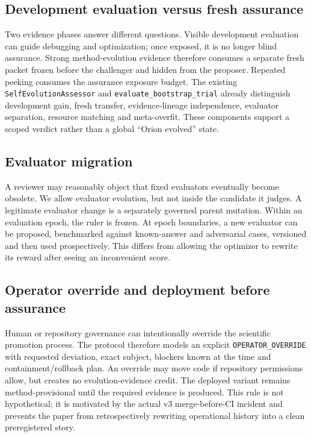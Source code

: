 \subsection{Development evaluation versus fresh assurance}

Two evidence phases answer different questions. Visible development evaluation can guide debugging and optimization; once exposed, it is no longer blind assurance. Strong method-evolution evidence therefore consumes a separate fresh packet frozen before the challenger and hidden from the proposer. Repeated peeking consumes the assurance exposure budget. The existing \texttt{SelfEvolutionAssessor} and \texttt{evaluate\_bootstrap\_trial} already distinguish development gain, fresh transfer, evidence-lineage independence, evaluator separation, resource matching and meta-overfit. These components support a scoped verdict rather than a global ``Orion evolved'' state.

\subsection{Evaluator migration}

A reviewer may reasonably object that fixed evaluators eventually become obsolete. We allow evaluator evolution, but not inside the candidate it judges. A legitimate evaluator change is a separately governed parent mutation. Within an evaluation epoch, the ruler is frozen. At epoch boundaries, a new evaluator can be proposed, benchmarked against known-answer and adversarial cases, versioned and then used prospectively. This differs from allowing the optimizer to rewrite its reward after seeing an inconvenient score.

\subsection{Operator override and deployment before assurance}

Human or repository governance can intentionally override the scientific promotion process. The protocol therefore models an explicit \texttt{OPERATOR\_OVERRIDE} with requested deviation, exact subject, blockers known at the time and containment/rollback plan. An override may move code if repository permissions allow, but creates no evolution-evidence credit. The deployed variant remains method-provisional until the required evidence is produced. This rule is not hypothetical; it is motivated by the actual v3 merge-before-CI incident and prevents the paper from retrospectively rewriting operational history into a clean preregistered story.

